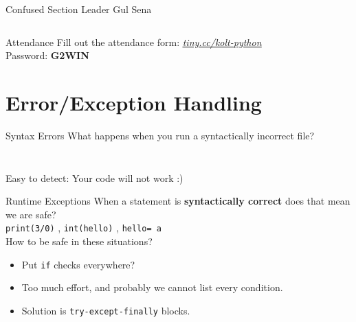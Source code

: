     \begin{frame}{Confused Section Leader Gul Sena}
        \inputminted[frame=single,framesep=2pt]{python3}{../Lecture6/code-examples/dicts.py}
    \end{frame}


    \begin{frame}{Attendance}
        \pause
        \Huge
        Fill out the attendance form: \href{https://tiny.cc/kolt-python}{\underline{\textit{tiny.cc/kolt-python}}}\\
        \pause
        Password: \textbf{G2WIN}
    \end{frame}



    \section{Error/Exception Handling}
    \begin{frame}{Syntax Errors}
        \LARGE
        What happens when you run a syntactically incorrect file?
        \pause
        \inputminted[frame=single,framesep=2pt,firstline=1,lastline=3]{python3}{./code_examples/syntax_error.py}
        \pause
        \inputminted[frame=single,framesep=2pt,firstline=5]{python3}{./code_examples/syntax_error.py}
        Easy to detect: Your code will not work :)
    \end{frame}

    \begin{frame}{Runtime Exceptions}
        \LARGE
        When a statement is \textbf{syntactically correct} does that mean we are safe?\\
        \pause
        \texttt{print(3/0)}
        \pause
        , \texttt{int(\textquotesingle hello\textquotesingle)}
        \pause
        , \texttt{\textquotesingle hello\textquotesingle [2] = \textquotesingle a\textquotesingle }\\
        \pause
        How to be safe in these situations?
        \begin{itemize}
            \pause
            \item Put \texttt{if} checks everywhere?
            \pause
            \item Too much effort, and probably we cannot list every condition.
            \pause
            \item Solution is \texttt{try-except-finally} blocks.
        \end{itemize}
    \end{frame}

